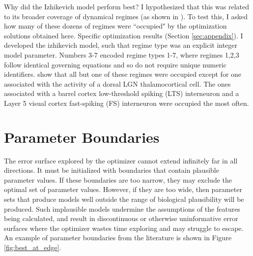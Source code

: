 Why did the Izhikevich model perform best?
I hypothesized that this was related to its broader coverage of dynamical regimes (as shown in \citep{izhikevich2003simple}).
To test this, I asked how many of these dozens of regimes were ``occupied" by the optimization solutions obtained here.
Specific optimization results (Section \ref{sec:appendix}).
I developed the izhikevich model, such that regime type was an explicit integer model parameter. Numbers 3-7 encoded regime types 1-7, where regimes 1,2,3 follow identical governing equations and so do not require unique numeric identifiers.
show that all but one of these regimes were occupied except for one associated with the activity of a dorsal LGN thalamocortical cell.
The ones associated with a barrel cortex low-threshold spiking (LTS) interneuron and a Layer 5 visual cortex fast-spiking (FS) interneuron were occupied the most often. 


\section{Parameter Boundaries}
The error surface explored by the optimizer cannot extend infinitely far in all directions.
It must be initialized with boundaries that contain plausible parameter values.
If these boundaries are too narrow, they may exclude the optimal set of parameter values.
However, if they are too wide, then parameter sets that produce models well outside the range of biological plausibility will be produced.
Such implausible models undermine the assumptions of the features being calculated, and result in discontinuous or otherwise uninformative error surfaces where the optimizer wastes time exploring and may struggle to escape.
An example of parameter boundaries from the literature is shown in Figure \ref{fig:best_at_edge}.

